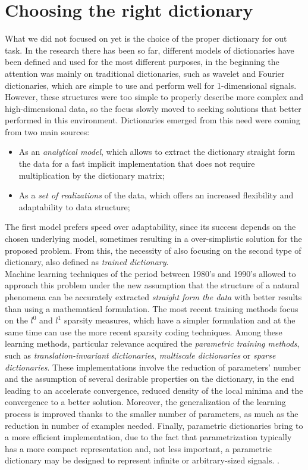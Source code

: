 \section{Choosing the right dictionary}
 What we did not focused on yet is the choice of the proper dictionary for out task. In the research there has been so far, different models of dictionaries have been defined and used for the most different purposes, in the beginning the attention was mainly on traditional dictionaries, such as wavelet and Fourier dictionaries, which are simple to use and perform well for 1-dimensional signals. However, these structures were too simple to properly describe more complex and high-dimensional data, so the focus slowly moved to seeking solutions that better performed in this environment. Dictionaries emerged from this need were coming from two main sources:
 \begin{itemize}
 \item As an \textit{analytical model}, which allows to extract the dictionary straight form the data for a fast implicit implementation that does not require multiplication by the dictionary matrix;
 \item As a \textit{set of realizations} of the data, which offers an increased flexibility and adaptability to data structure;
\end{itemize}
The first model prefers speed over adaptability, since its success depends on the chosen underlying model, sometimes resulting in a over-simplistic solution for the proposed problem. From this, the necessity of also focusing on the second type of dictionary, also defined as \textit{trained dictionary}.\\
Machine learning techniques of the period between 1980's and 1990's allowed to approach this problem under the new assumption that the structure of a natural phenomena can be accurately extracted \textit{straight form the data} with better results than using a mathematical formulation. The most recent training methods focus on the $l^0$ and $l^1$ sparsity measures, which have a simpler formulation and at the same time can use the more recent sparsity coding techniques. \cite{Gorodnitsky1997} \cite{Pati1993}
Among these learning methods, particular relevance acquired the \textit{parametric training methods}, such as \textit{translation-invariant dictionaries}, \textit{multiscale dictionaries} or \textit{sparse dictionaries}. These implementations involve the reduction of parameters' number and the assumption of several desirable properties on the dictionary, in the end leading to an accelerate convergence, reduced density of the local minima and the convergence to a better solution. Moreover, the generalization of the learning process is improved thanks to the smaller number of parameters, as much as the reduction in number of examples needed. Finally, parametric dictionaries bring to a more efficient implementation, due to the fact that parametrization typically has a more compact representation and, not less important, a parametric dictionary may be designed to represent infinite or arbitrary-sized signals. \cite{Rubinstein2010} .
